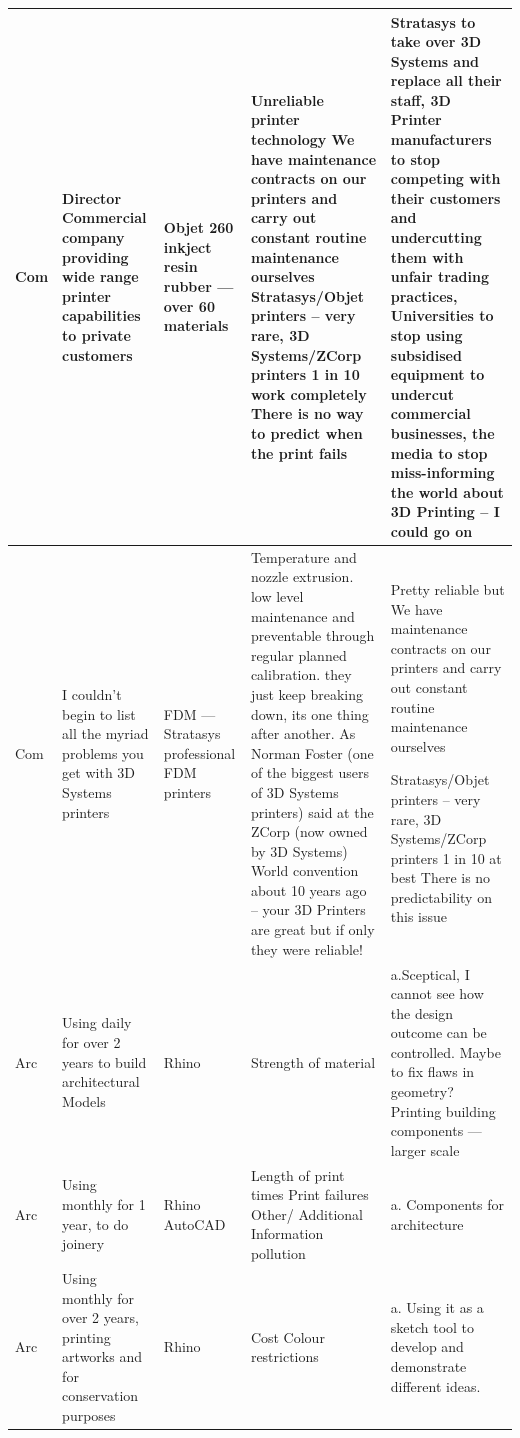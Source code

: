 \documentclass[pdftex, 11pt]{report} %
\begin{document}
\begin{longtable}{| p{1cm} | p{2.5cm} | p{2cm} | p{4cm} | p{4cm} |}
Com & Director Commercial company providing wide range printer capabilities to private customers 
 & Objet 260
inkject 
resin 
rubber --- over 60 materials & Unreliable printer technology
We have maintenance contracts on our printers and carry out constant routine maintenance ourselves
Stratasys/Objet printers – very rare, 3D Systems/ZCorp printers 1 in 10 work completely There is no way to predict when the print fails  & Stratasys to take over 3D Systems and replace all their staff, 3D Printer manufacturers to stop competing with their customers and undercutting them with unfair trading practices, Universities to stop using subsidised equipment to undercut commercial businesses, the media to stop miss-informing the world about 3D Printing – I could go on  \\\hline

Com & I couldn’t begin to list all the myriad problems you get with 3D Systems printers & FDM --- Stratasys professional FDM printers  & Temperature and nozzle extrusion. low level maintenance and preventable through regular planned calibration.  they just keep breaking down, its one thing after another. As Norman Foster (one of the biggest users of 3D Systems printers) said at the ZCorp (now owned by 3D Systems) World convention about 10 years ago – your 3D Printers are great but if only they were reliable! & Pretty reliable but We have maintenance contracts on our printers and carry out constant routine maintenance ourselves

 Stratasys/Objet printers – very rare, 3D Systems/ZCorp printers 1 in 10 at best There is no predictability on this issue \\\hline

Arc & Using daily for over 2 years to build architectural Models & Rhino & Strength of material & a.Sceptical, I cannot see how the design outcome can be controlled. Maybe to fix flaws in geometry?
Printing building components --- larger scale \\\hline

Arc & Using monthly for 1 year, to do joinery & Rhino AutoCAD & Length of print times
Print failures
Other/ Additional Information pollution & a. Components for architecture \\\hline

Arc &  Using monthly  for over 2 years, printing artworks and for conservation purposes & Rhino & Cost Colour restrictions & a. Using it as a sketch tool to develop and demonstrate different ideas. \\\hline


\end{longtable}
\end{document}
